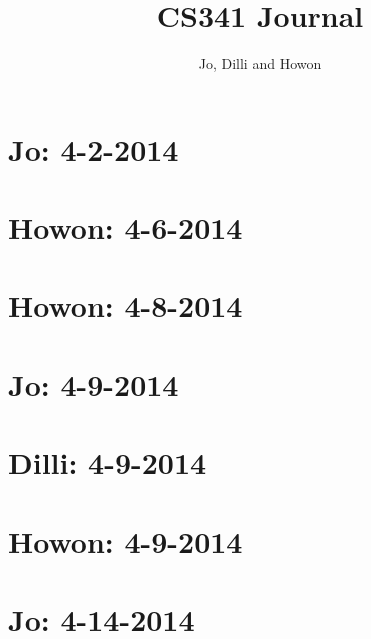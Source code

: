 


\author{Jo, Dilli and Howon}\title{CS341 Journal}\maketitle

\section*{Jo: 4-2-2014}


\section*{Howon: 4-6-2014}


\section*{Howon: 4-8-2014}


\section*{Jo: 4-9-2014}


\section*{Dilli: 4-9-2014}


\section*{Howon: 4-9-2014}


\section*{Jo: 4-14-2014}




